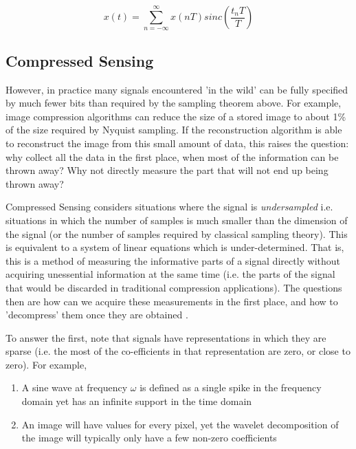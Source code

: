 \begin{equation}
x\left(t\right) = \sum_{n=-\infty}^\infty x\left(nT\right) sinc\left(\frac{t_nT}{T}\right)
\end{equation}

\subsection{Compressed Sensing}

However, in practice many signals encountered 'in the wild' can be fully specified by much fewer bits than required by the sampling theorem above. For example, image compression algorithms can reduce the size of a stored image to about 1\% of the size required by Nyquist sampling. If the reconstruction algorithm is able to reconstruct the image from this small amount of data, this raises the question: why collect all the data in the first place, when most of the information can be thrown away? Why not directly measure the part that will not end up being thrown away?

Compressed Sensing considers situations where the signal is \textit{undersampled} i.e. situations in which the number of samples is much smaller than the dimension of the signal (or the number of samples required by classical sampling theory). This is equivalent to a system of linear equations which is under-determined.  That is, this is a method of measuring the informative parts of a signal directly without acquiring unessential information at the same time (i.e. the parts of the signal that would be discarded in traditional compression applications). The questions then are how can we acquire these measurements in the first place, and how to 'decompress' them once they are obtained \cite{Donoho2006}. 

To answer the first, note that signals have representations in which they are sparse (i.e. the most of the co-efficients in that representation are zero, or close to zero). For example, 

\begin{enumerate}
\item  A sine wave at frequency \(\omega\) is defined as a single spike in the frequency domain yet has an infinite support in the time domain
\item An image will have values for every pixel, yet the wavelet decomposition of the image will typically only have a few non-zero coefficients
\end{enumerate} 

